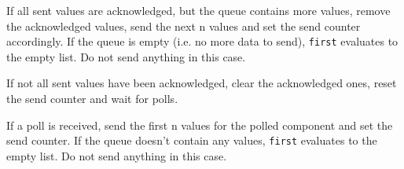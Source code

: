 \documentclass{report}
\begin{document}

\begin{mathpar}
\end{mathpar}
If all sent values are acknowledged, but the queue contains more values, remove the acknowledged values, send the next n values and set the send counter accordingly. If the queue is empty (i.e. no more data to send), \texttt{first} evaluates to the empty list. Do not send anything in this case.

\begin{mathpar}
\end{mathpar}
If not all sent values have been acknowledged, clear the acknowledged ones, reset the send counter and wait for polls.

\begin{mathpar}
\end{mathpar}
If a poll is received, send the first n values for the polled component and set the send counter. If the queue doesn't contain any values, \texttt{first} evaluates to the empty list. Do not send anything in this case.
\end{document}
